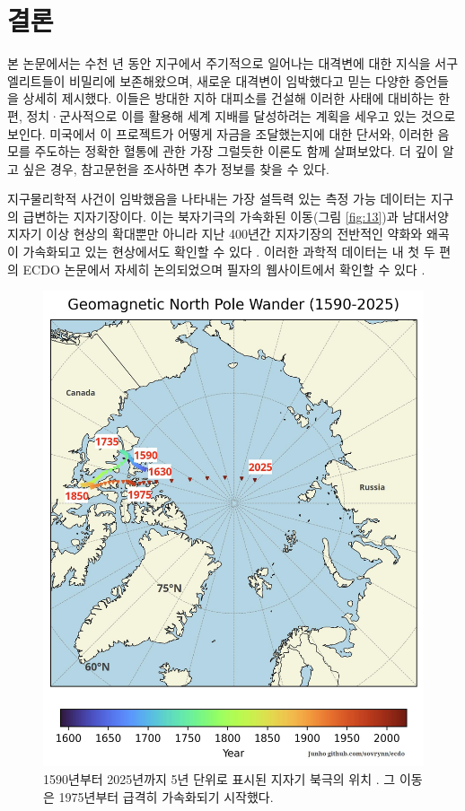 \documentclass[10pt,twocolumn,letterpaper]{article}
\begin{document}
\section{결론}

본 논문에서는 수천 년 동안 지구에서 주기적으로 일어나는 대격변에 대한 지식을 서구 엘리트들이 비밀리에 보존해왔으며, 새로운 대격변이 임박했다고 믿는 다양한 증언들을 상세히 제시했다. 이들은 방대한 지하 대피소를 건설해 이러한 사태에 대비하는 한편, 정치·군사적으로 이를 활용해 세계 지배를 달성하려는 계획을 세우고 있는 것으로 보인다. 미국에서 이 프로젝트가 어떻게 자금을 조달했는지에 대한 단서와, 이러한 음모를 주도하는 정확한 혈통에 관한 가장 그럴듯한 이론도 함께 살펴보았다. 더 깊이 알고 싶은 경우, 참고문헌을 조사하면 추가 정보를 찾을 수 있다.

지구물리학적 사건이 임박했음을 나타내는 가장 설득력 있는 측정 가능 데이터는 지구의 급변하는 지자기장이다. 이는 북자기극의 가속화된 이동(그림 \ref{fig:13})과 남대서양 지자기 이상 현상의 확대뿐만 아니라 지난 400년간 지자기장의 전반적인 약화와 왜곡이 가속화되고 있는 현상에서도 확인할 수 있다 \cite{3}. 이러한 과학적 데이터는 내 첫 두 편의 ECDO 논문에서 자세히 논의되었으며 필자의 웹사이트에서 확인할 수 있다 \cite{3}.


\begin{figure}[t]
\begin{center}
\includegraphics[width=1\linewidth]{npw.jpg}
\end{center}
\caption{1590년부터 2025년까지 5년 단위로 표시된 지자기 북극의 위치 \cite{41}. 그 이동은 1975년부터 급격히 가속화되기 시작했다.}
\label{fig:13}
\label{fig:onecol}
\end{figure}
\end{document}
